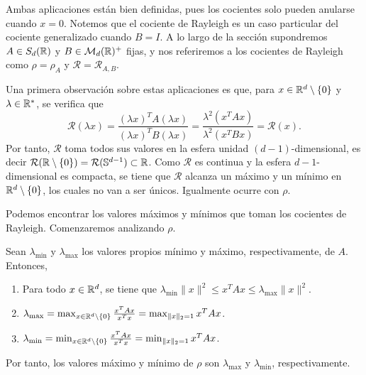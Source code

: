 Ambas aplicaciones están bien definidas, pues los cocientes solo pueden anularse cuando $x = 0$. Notemos que el cociente de Rayleigh es un caso particular del cociente generalizado cuando $B = I$. A lo largo de la sección supondremos $A \in S_d(\mathbb{R})$ y $B \in \mathcal{M}_d(\mathbb{R})^+$ fijas, y nos referiremos a los cocientes de Rayleigh como $\rho = \rho_A$ y $\mathcal{R} = \mathcal{R}_{A,B}$.

Una primera observación sobre estas aplicaciones es que, para $x \in \mathbb{R}^d \setminus \{0\}$ y $\lambda \in \mathbb{R}^*$, se verifica que
\[ \mathcal{R}(\lambda x) = \frac{(\lambda x)^TA(\lambda x)}{(\lambda x)^TB(\lambda x)} = \frac{\lambda^2(x^TAx)}{\lambda^2(x^TBx)} = \mathcal{R}(x). \]
Por tanto, $\mathcal{R}$ toma todos sus valores en la esfera unidad $(d-1)$-dimensional, es decir $\mathcal{R}(\mathbb{R} \setminus \{0\}) = \mathcal{R}(\mathbb{S}^{d-1}) \subset \mathbb{R}$. Como $\mathcal{R}$ es continua y la esfera $d-1$-dimensional es compacta, se tiene que $\mathcal{R}$ alcanza un máximo y un mínimo en $\mathbb{R}^d \setminus \{0\}$, los cuales no van a ser únicos. Igualmente ocurre con $\rho$.

Podemos encontrar los valores máximos y mínimos que toman los cocientes de Rayleigh. Comenzaremos analizando $\rho$.


\begin{thm}
    Sean $\lambda_{\min}$ y $\lambda_{\max}$ los valores propios mínimo y máximo, respectivamente, de $A$. Entonces,
    \begin{enumerate}
        \item Para todo $x \in \mathbb{R}^d$, se tiene que $\lambda_{\min} \|x\|^2 \le x^TAx \le \lambda_{\max}\|x\|^2$.
        \item $\lambda_{\max} = \max_{x \in \mathbb{R}^d \setminus \{0\}} \frac{x^TAx}{x^Tx} = \max_{\|x\|_2 = 1} x^TAx$.
        \item $\lambda_{\min} = \min_{x \in \mathbb{R}^d \setminus \{0\}} \frac{x^TAx}{x^Tx} = \min_{\|x\|_2 = 1} x^TAx$.
    \end{enumerate}
    Por tanto, los valores máximo y mínimo de $\rho$ son $\lambda_{\max}$ y $\lambda_{\min}$, respectivamente.
\end{thm}

